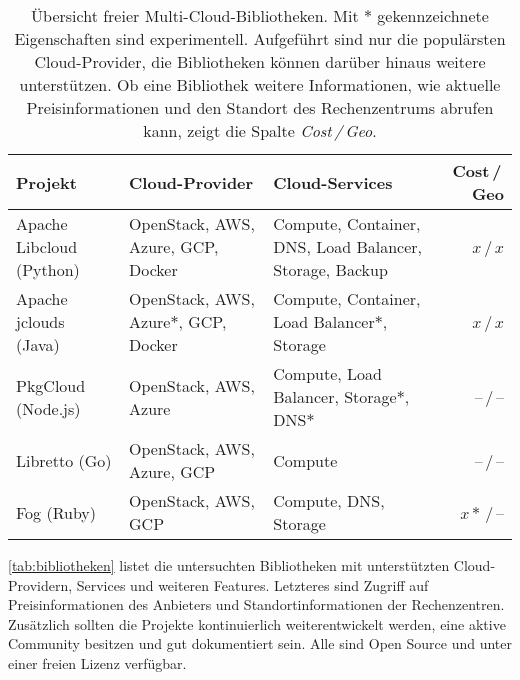 \begin{table*}\centering
	\begin{minipage}{\textwidth}
	\caption{Übersicht freier Multi-Cloud-Bibliotheken. Mit $*$ gekennzeichnete Eigenschaften sind experimentell. Aufgeführt sind nur die populärsten Cloud-Provider, die Bibliotheken können darüber hinaus weitere unterstützen. Ob eine Bibliothek weitere Informationen, wie aktuelle Preisinformationen und den Standort des Rechenzentrums abrufen kann, zeigt die Spalte \emph{Cost\,/\,Geo}.}
	\begin{tabularx}{\textwidth}{>{\centering}XXXr} \toprule
		Projekt & Cloud-Provider & Cloud-Services & Cost\,/\,Geo\\ \midrule
		Apache Libcloud (Python)\footnotemark & OpenStack, AWS, Azure, GCP, Docker & Compute, Container, DNS, Load Balancer, Storage, Backup & $x$\,/\,$x$\\
		Apache jclouds (Java)\footnotemark & OpenStack, AWS, Azure$*$, GCP, Docker & Compute, Container, Load Balancer$*$, Storage & $x$\,/\,$x$\\
		PkgCloud (Node.js)\footnotemark & OpenStack, AWS, Azure & Compute, Load Balancer, Storage$*$, DNS$*$ & --\,/\,--\\
		Libretto (Go)\footnotemark & OpenStack, AWS, Azure, GCP & Compute & --\,/\,--\\
		Fog (Ruby)\footnotemark & OpenStack, AWS, GCP & Compute, DNS, Storage & $x*$\,/\,--\\
		\bottomrule
	\end{tabularx}
	\label{tab:bibliotheken}
	\vspace{150pt}
\end{minipage}  
\end{table*}

\autoref*{tab:bibliotheken} listet die untersuchten Bibliotheken mit unterstützten Cloud-Providern, Services und weiteren Features. Letzteres sind Zugriff auf Preisinformationen des Anbieters und Standortinformationen der Rechenzentren. Zusätzlich sollten die Projekte kontinuierlich weiterentwickelt werden, eine aktive Community besitzen und gut dokumentiert sein. Alle sind Open Source und unter einer freien Lizenz verfügbar.

